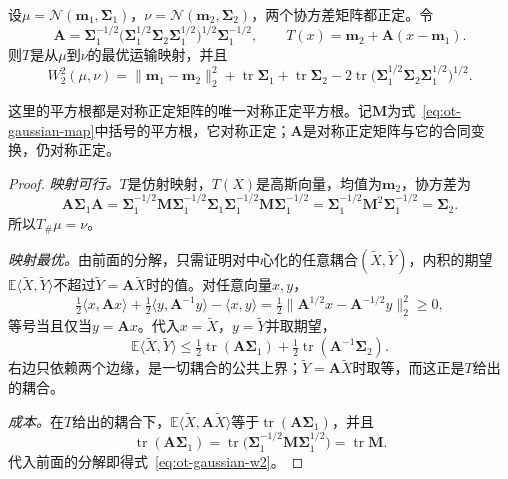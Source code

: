 \begin{theorem}[高斯分布的平方运输]
\label{thm:ot-gaussian}
设$\mu=\mathcal{N}(\bm{m}_1,\bm{\Sigma}_1)$，$\nu=\mathcal{N}(\bm{m}_2,\bm{\Sigma}_2)$，两个协方差矩阵都正定。令
\begin{equation}
 \bm{A}=\bm{\Sigma}_1^{-1/2}\bigl(\bm{\Sigma}_1^{1/2}\bm{\Sigma}_2\bm{\Sigma}_1^{1/2}\bigr)^{1/2}\bm{\Sigma}_1^{-1/2},\qquad T(x)=\bm{m}_2+\bm{A}(x-\bm{m}_1).
 \label{eq:ot-gaussian-map}
\end{equation}
则$T$是从$\mu$到$\nu$的最优运输映射，并且
\begin{equation}
 W_2^{2}(\mu,\nu)=\lVert\bm{m}_1-\bm{m}_2\rVert_2^{2}+\operatorname{tr}\bm{\Sigma}_1+\operatorname{tr}\bm{\Sigma}_2-2\operatorname{tr}\bigl(\bm{\Sigma}_1^{1/2}\bm{\Sigma}_2\bm{\Sigma}_1^{1/2}\bigr)^{1/2}.
 \label{eq:ot-gaussian-w2}
\end{equation}
\end{theorem}

这里的平方根都是对称正定矩阵的唯一对称正定平方根。记$\bm{M}$为式~\eqref{eq:ot-gaussian-map}中括号的平方根，它对称正定；$\bm{A}$是对称正定矩阵与它的合同变换，仍对称正定。

\begin{proof}
\emph{映射可行。}$T$是仿射映射，$T(X)$是高斯向量，均值为$\bm{m}_2$，协方差为
\[
 \bm{A}\bm{\Sigma}_1\bm{A}=\bm{\Sigma}_1^{-1/2}\bm{M}\bm{\Sigma}_1^{-1/2}\bm{\Sigma}_1\bm{\Sigma}_1^{-1/2}\bm{M}\bm{\Sigma}_1^{-1/2}=\bm{\Sigma}_1^{-1/2}\bm{M}^{2}\bm{\Sigma}_1^{-1/2}=\bm{\Sigma}_2 .
\]
所以$T_\#\mu=\nu$。

\emph{映射最优。}由前面的分解，只需证明对中心化的任意耦合$(\tilde{X},\tilde{Y})$，内积的期望$\mathbb{E}\langle\tilde{X},\tilde{Y}\rangle$不超过$\tilde{Y}=\bm{A}\tilde{X}$时的值。对任意向量$x,y$，
\[
 \tfrac12\langle x,\bm{A}x\rangle+\tfrac12\langle y,\bm{A}^{-1}y\rangle-\langle x,y\rangle=\tfrac12\bigl\lVert\bm{A}^{1/2}x-\bm{A}^{-1/2}y\bigr\rVert_2^{2}\geq0 ,
\]
等号当且仅当$y=\bm{A}x$。代入$x=\tilde{X}$，$y=\tilde{Y}$并取期望，
\[
 \mathbb{E}\langle\tilde{X},\tilde{Y}\rangle\leq\tfrac12\operatorname{tr}(\bm{A}\bm{\Sigma}_1)+\tfrac12\operatorname{tr}(\bm{A}^{-1}\bm{\Sigma}_2).
\]
右边只依赖两个边缘，是一切耦合的公共上界；$\tilde{Y}=\bm{A}\tilde{X}$时取等，而这正是$T$给出的耦合。

\emph{成本。}在$T$给出的耦合下，$\mathbb{E}\langle\tilde{X},\bm{A}\tilde{X}\rangle$等于$\operatorname{tr}(\bm{A}\bm{\Sigma}_1)$，并且
\[
 \operatorname{tr}(\bm{A}\bm{\Sigma}_1)=\operatorname{tr}\bigl(\bm{\Sigma}_1^{-1/2}\bm{M}\bm{\Sigma}_1^{1/2}\bigr)=\operatorname{tr}\bm{M} .
\]
代入前面的分解即得式~\eqref{eq:ot-gaussian-w2}。
\end{proof}

